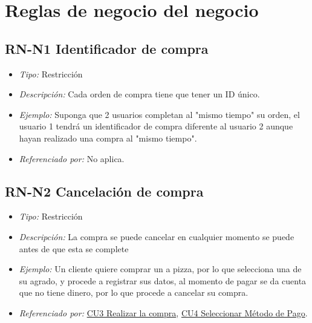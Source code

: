 
\pagebreak
\section{Reglas de negocio del negocio}

	\hypertarget{RN:N1:ID}{}
	\subsection{RN-N1 Identificador de compra}

		\begin{itemize}

			\item \textit{Tipo:} Restricción

			\item \textit{Descripción:} Cada orden de compra tiene que tener un ID único.

			\item \textit{Ejemplo:} Suponga que 2 usuarios completan al "mismo tiempo" su orden, el usuario 1 tendrá un identificador de compra diferente al usuario 2 aunque hayan realizado una compra al "mismo tiempo".

			\item \textit{Referenciado por:} No aplica.

		\end{itemize}

\hypertarget{RN:N2:Cancelacion}{}
\subsection{RN-N2 Cancelación de compra}

\begin{itemize}
	
	\item \textit{Tipo:} Restricción
	
	\item \textit{Descripción:} La compra se puede cancelar en cualquier momento se puede antes de que esta se complete
	
	\item \textit{Ejemplo:} Un cliente quiere comprar un a pizza, por lo que selecciona una de su agrado, y procede a registrar sus datos, al momento de pagar se da cuenta que no tiene dinero, por lo que procede a cancelar su compra.
	
	\item \textit{Referenciado por:} \hyperlink{CU3}{CU3 Realizar la compra}, \hyperlink{CU4}{CU4 Seleccionar Método de Pago}.
	
\end{itemize}

